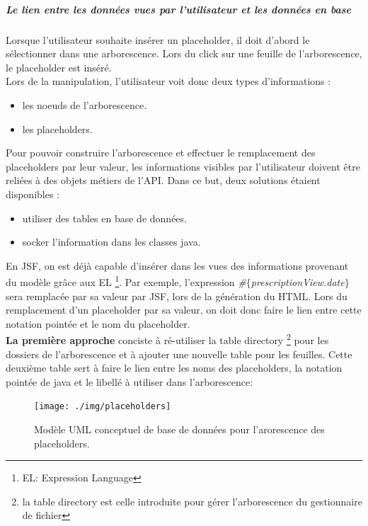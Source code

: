 \subparagraph*{Le lien entre les données vues par l'utilisateur et les données en base}

Lorsque l'utilisateur souhaite insérer un placeholder, il doit d'abord le sélectionner dans une arborescence. 
Lors du click sur une feuille de l'arborescence, le placeholder est inséré.  \\

Lors de la manipulation, l'utilisateur voit donc deux types d'informations : 
\begin{itemize}
\item les noeuds de l'arborescence.
\item les placeholders.
\end{itemize}

Pour pouvoir construire l'arborescence et effectuer le remplacement des placeholders par leur valeur, les informations visibles par l'utilisateur doivent être reliées à des objets métiers de l'API.
Dans ce but, deux solutions étaient disponibles : 
\begin{itemize}
\item utiliser des tables en base de données.
\item socker l'information dans les classes java. %
\end{itemize}

En JSF, on est déjà capable d'insérer dans les vues des informations provenant du modèle grâce aux EL \footnote{EL: Expression Language}. Par exemple, l'expression \textit{\#$\{$prescriptionView.date$\}$} sera remplacée par sa valeur par JSF, lors de la génération du HTML. Lors du remplacement d'un placeholder par sa valeur, on doit donc faire le lien entre cette notation pointée et le nom du placeholder.\\

\textbf{La première approche} conciste à ré-utiliser la table directory \footnote{la table directory est celle introduite pour gérer l'arborescence du gestionnaire de fichier} pour les dossiers de l'arborescence et à ajouter une nouvelle table pour les feuilles. Cette deuxième table sert à faire le lien entre les noms des placeholders, la notation pointée de java et le libellé à utiliser dans l'arborescence:\\

\begin{figure}[H]
  \centering
  \texttt{[image: ./img/placeholders]}
  \caption{\label{fig:mb_va_ast} Modèle UML conceptuel de base de données pour l'arorescence des placeholders.}
\end{figure}


